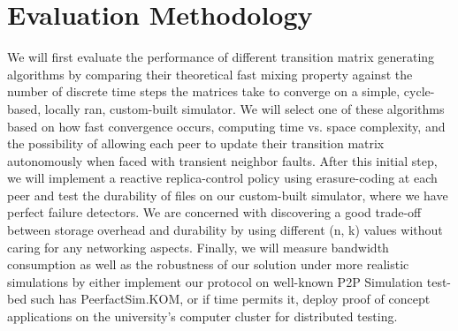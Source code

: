 \documentclass[runningheads]{llncs}
\begin{document}

\newpage\section{Evaluation Methodology}\label{sec:methodology}
We will first evaluate the performance of different transition matrix generating algorithms by comparing their theoretical fast mixing property against the number of discrete time steps the matrices take to converge on a simple, cycle-based, locally ran, custom-built simulator. We will select one of these algorithms based on how fast convergence occurs, computing time vs. space complexity, and the possibility of allowing each peer to update their transition matrix autonomously when faced with transient neighbor faults. After this initial step, we will implement a reactive replica-control policy using erasure-coding at each peer and test the durability of files on our custom-built simulator, where we have perfect failure detectors. We are concerned with discovering a good trade-off between storage overhead and durability by using different (n, k) values without caring for any networking aspects. Finally, we will measure bandwidth consumption as well as the robustness of our solution under more realistic simulations by either implement our protocol on well-known P2P Simulation test-bed such has PeerfactSim.KOM\cite{peerfact}, or if time permits it, deploy proof of concept applications on the university's computer cluster for distributed testing.


\end{document}
